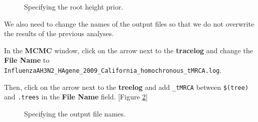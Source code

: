 \documentclass[11pt]{article}
\begin{document}
\begin{figure}[h!]
\centering
{}
\caption{\small Specifying the root height prior.}
\label{tMRCAPrior2}
\end{figure}

We also need to change the names of the output files so that we do not overwrite the results of the previous analyses.

\begin{framed}
In the \textbf{MCMC} window, click on the arrow next to the \textbf{tracelog} and change the \textbf{File Name} to \texttt{InfluenzaAH3N2\_HAgene\_2009\_California\_homochronous\_tMRCA.log}.

Then, click on the arrow next to the \textbf{treelog} and add \texttt{\_tMRCA} between \texttt{\$(tree)} and \texttt{.trees} in the \textbf{File Name} field. [Figure \ref{tMRCAPrior3}]
\end{framed}

\begin{figure}[h!]
\centering
{}
\caption{\small Specifying the output file names.}
\label{tMRCAPrior3}
\end{figure}
\end{document}
